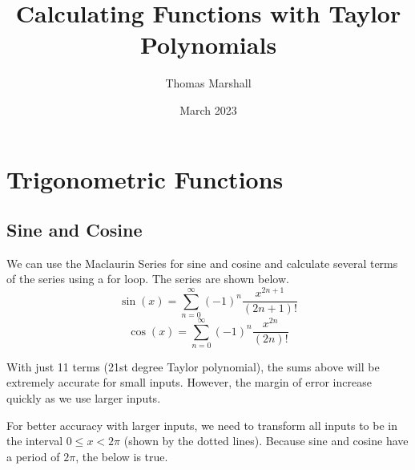 \documentclass[12pt, letterpaper]{article}
\title{Calculating Functions with Taylor Polynomials}
\author{Thomas Marshall}
\date{March 2023}
\begin{document}
\maketitle

\tableofcontents
\pagebreak

\section{Trigonometric Functions}

\subsection{Sine and Cosine}
We can use the Maclaurin Series for sine and cosine and calculate several terms of the series using a for loop. The series are shown below.
\[ \sin(x) = \sum_{n=0}^{\infty}\left(-1\right)^{n}\frac{x^{2n+1}}{\left(2n+1\right)!} \]
\[ \cos(x) = \sum_{n=0}^{\infty}\left(-1\right)^{n}\frac{x^{2n}}{\left(2n\right)!} \]

With just 11 terms (21st degree Taylor polynomial), the sums above will be extremely accurate for small inputs. However, the margin of error increase quickly as we use larger inputs.

\begin{center}
\end{center}

For better accuracy with larger inputs, we need to transform all inputs to be in the interval $0 \leq x < 2\pi$ (shown by the dotted lines).
Because sine and cosine have a period of $2\pi$, the below is true.
\end{document}
